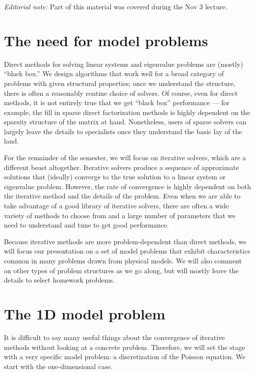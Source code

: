 \documentclass[12pt, leqno]{article} %
\begin{document}

{\em Editorial note:} Part of this material was covered during the Nov
3 lecture.

\section{The need for model problems}

Direct methods for solving linear systems and eigenvalue problems are
(mostly) ``black box.''  We design algorithms that work well for a
broad category of problems with given structural properties; once we
understand the structure, there is often a reasonably routine choice
of solvers.  Of course, even for direct methods, it is not entirely
true that we get ``black box'' performance --- for example, the fill
in sparse direct factorization methods is highly dependent on the
sparsity structure of the matrix at hand.  Nonetheless, users of
sparse solvers can largely leave the details to specialists once they
understand the basic lay of the land.

For the remainder of the semester, we will focus on iterative solvers,
which are a different beast altogether.  Iterative solvers produce a
sequence of approximate solutions that (ideally) converge to the true
solution to a linear system or eigenvalue problem.  However, the rate
of convergence is highly dependent on both the iterative method and
the details of the problem.  Even when we are able to take advantage
of a good library of iterative solvers, there are often a wide variety
of methods to choose from and a large number of parameters that we need
to understand and tune to get good performance.

Because iterative methods are more problem-dependent than direct methods,
we will focus our presentation on a set of model problems that exhibit
characteristics common in many problems drawn from physical models.
We will also comment on other types of problem structures as we go along,
but will mostly leave the details to select homework problems.

\section{The 1D model problem}

It is difficult to say many useful
things about the convergence of iterative methods without looking at a
concrete problem.  Therefore, we will set the stage with a very
specific model problem: a discretization of the Poisson equation.
We start with the one-dimensional case.
\end{document}

